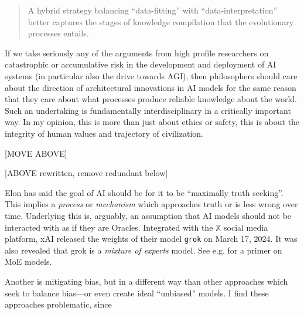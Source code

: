 \documentclass[11pt, oneside]{article}   	%
\begin{document}
\begin{quote}
    A hybrid strategy balancing ``data-fitting'' with ``data-interpretation'' better captures the stages of knowledge compilation that the evolutionary processes entails. \citep[p. 80]{Pearl2021}
\end{quote}


If we take seriously any of the arguments from high profile researchers on catastrophic or accumulative risk in the development and deployment of AI systems (in particular also the drive towards AGI), then philosophers should care about the direction of architectural innovations in AI models for the same reason that they care about what processes produce reliable knowledge about the world.  Such an undertaking is fundamentally interdisciplinary in a critically important way.  In my opinion, this is more than just about ethics or safety, this is about the integrity of human values and trajectory of civilization.


[MOVE ABOVE]






[ABOVE rewritten, remove redundant below]




Elon has said the goal of AI should be for it to be ``maximally truth seeking''.  This implies a \emph{process} or \emph{mechanism} which approaches truth or is less wrong over time.  Underlying this is, arguably, an assumption that AI models should not be interacted with as if they are Oracles.  Integrated with the $\mathbb{X}$ social media platform, xAI released the weights of their model \texttt{grok} on March 17, 2024.  It was also revealed that grok is a \emph{mixture of experts} model.  See e.g. \citep{HFMOE} for a primer on MoE models.

Another is mitigating bias, but in a different way than other approaches which seek to balance bias---or even create ideal ``unbiased'' models.  I find these approaches problematic, since 
\end{document}
